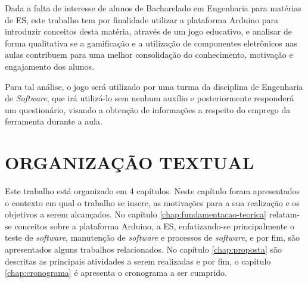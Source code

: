  Dada a falta de interesse de alunos de Bacharelado em Engenharia para matérias de ES, este trabalho tem por finalidade utilizar a plataforma Arduino para introduzir conceitos desta matéria, através de um jogo educativo, e analisar de forma qualitativa se a gamificação e a utilização de componentes eletrônicos nas aulas contribuem para uma melhor consolidação do conhecimento, motivação e engajamento dos alunos.
 
 Para tal análise, o jogo será utilizado por uma turma da disciplina de Engenharia de \textit{Software}, que irá utilizá-lo sem nenhum auxílio e posteriormente responderá um questionário, visando a obtenção de informações a respeito do emprego da ferramenta durante a aula.
 
 \section{ORGANIZAÇÃO TEXTUAL}
 \label{sec:orgTextual}
 
Este trabalho está organizado em 4 capítulos. Neste capítulo foram apresentados o contexto em qual o trabalho se insere, as motivações para a sua realização e os objetivos a serem alcançados. No capítulo \ref{chap:fundamentacao-teorica} relatam-se conceitos sobre a plataforma Arduino, a ES, enfatizando-se principalmente o teste de \textit{software}, manutenção de \textit{software} e processos de \textit{software}, e por fim, são apresentados alguns trabalhos relacionados. No capítulo \ref{chap:proposta} são descritas as principais atividades a serem realizadas e por fim, o capítulo \ref{chap:cronograma} é apresenta o cronograma a ser cumprido.